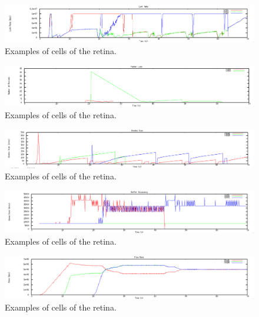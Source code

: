 \documentclass[12pt]{article}
\begin{document}
\begin{figure}[!ht]
\centering \includegraphics[bb= 0 0 1300 250, scale=.35]{figures/Test2_Tahoe/link_rate.png}
\caption{Examples of cells of the retina.}
\label{fig:test2_tahoe_link_rate}
\end{figure}

\begin{figure}[!ht]
\centering \includegraphics[bb= 0 0 1300 250, scale=.35]{figures/Test2_Tahoe/packet_loss.png}
\caption{Examples of cells of the retina.}
\label{fig:test2_tahoe_packet_loss}
\end{figure}

\begin{figure}[!ht]
\centering \includegraphics[bb= 0 0 1300 250, scale=.35]{figures/Test2_Tahoe/window_size.png}
\caption{Examples of cells of the retina.}
\label{fig:test2_tahoe_window_size}
\end{figure}

\newpage


\begin{figure}[!ht]
\centering \includegraphics[bb= 0 0 1300 250, scale=.35]{figures/Test2_Vegas/buffer_occ.png}
\caption{Examples of cells of the retina.}
\label{fig:test2_vegas_buffer_occ}
\end{figure}

\begin{figure}[!ht]
\centering \includegraphics[bb= 0 0 1300 250, scale=.35]{figures/Test2_Vegas/flow_rate.png}
\caption{Examples of cells of the retina.}
\label{fig:test2_vegas_flow_rate}
\end{figure}
\end{document}
